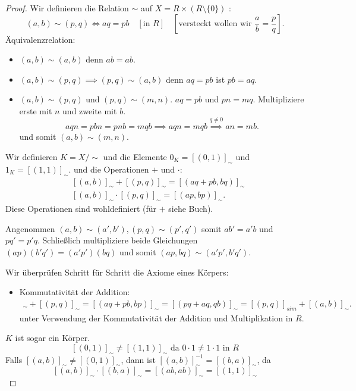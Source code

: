\begin{proof}
	Wir definieren die Relation $\sim$ auf $X = R \times (R \setminus \{0\} )$ :
	\[
		(a,b) \sim (p,q) \Leftrightarrow aq = pb \quad [\text{in } R] \quad [\text{versteckt wollen wir } \frac{a}{b} = \frac{p}{q}]
	.\]
	Äquivalenzrelation:
	\begin{itemize}
		\item $(a,b) \sim (a,b)$ denn $ab = ab$.
		\item $(a,b) \sim (p,q) \implies (p,q) \sim (a,b)$ denn $aq = pb$ ist $pb = aq$.
		\item $(a,b) \sim (p,q)$ und $(p,q) \sim (m,n)$.
			$aq = pb$ und $pn = mq$. Multipliziere erste mit $n$ und zweite mit $b$.
			\[
				aqn = pbn = pnb = mqb \implies aqn = mqb \stackrel{q \neq 0}{\implies} an = mb
			.\] 
			und somit $(a,b) \sim (m,n)$.
	\end{itemize}
	Wir definieren $K = X / \sim$ und die Elemente $0_{K} = [(0,1)]_{\sim}$  und $1_{K} = [(1,1)]_{\sim}$.
	und die Operationen $+$ und $\cdot$:
	\begin{align*}
		&[(a,b)]_{\sim} + [(p,q)]_{\sim} = [(aq + pb, bq)]_{\sim}\\
		&[(a,b)]_{\sim} \cdot [(p,q)]_{\sim} = [(ap,bp)]_{\sim}
	.\end{align*}
	Diese Operationen sind wohldefiniert (für $+$ siehe Buch).

	Angenommen $(a,b) \sim (a',b'), (p,q) \sim (p',q')$ somit $ab' = a'b$ und $pq' = p'q$.
	Schließlich multipliziere beide Gleichungen  $(a p) (b'q') = (a'p') (b q)$ und somit $(ap,bq) \sim (a'p',b'q')$.

	Wir überprüfen Schritt für Schritt die Axiome eines Körpers:
	\begin{itemize}
		\item Kommutativität der Addition:
			\begin{align*}
				[(a,b)]_{\sim} + [(p,q)]_{\sim} = [(aq+pb,bp)]_{\sim} = [(pq+aq,qb)]_{\sim} = [(p,q)]_{sim} + [(a,b)]_{\sim}
			.\end{align*}
			unter Verwendung der Kommutativität der Addition und Multiplikation in $R$.
	\end{itemize}
	$K$ ist sogar ein Körper.
	\[
		[(0,1)]_{\sim} \neq [(1,1)]_{\sim} \text{ da } 0\cdot 1 \neq  1\cdot 1 \text{ in } R
	\] 
	Falls $[(a,b)]_{\sim} \neq [(0,1)]_{\sim}$, dann ist $[(a,b)]_{\sim}^{-1} = [(b,a)]_{\sim}$, da 
	\[
		[(a,b)]_{\sim} \cdot [(b,a)]_{\sim} = [(ab,ab)]_{\sim} = [(1,1)]_{\sim}
	\]
\end{proof}

